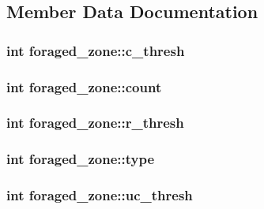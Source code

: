 \subsection{Member Data Documentation}
\hypertarget{classforaged__zone_a0d0a0849a8d31d4644378ec94fa840e5}{
\subsubsection[{c\-\_\-thresh}]{\setlength{\rightskip}{0pt plus 5cm}int foraged\-\_\-zone\-::c\-\_\-thresh}}\label{classforaged__zone_a0d0a0849a8d31d4644378ec94fa840e5}
\hypertarget{classforaged__zone_a97455af0ff760dde682fa9d846ef58fd}{
\subsubsection[{count}]{\setlength{\rightskip}{0pt plus 5cm}int foraged\-\_\-zone\-::count}}\label{classforaged__zone_a97455af0ff760dde682fa9d846ef58fd}
\hypertarget{classforaged__zone_ace74d9e1d0474dfe6820e03ac31761a6}{
\subsubsection[{r\-\_\-thresh}]{\setlength{\rightskip}{0pt plus 5cm}int foraged\-\_\-zone\-::r\-\_\-thresh}}\label{classforaged__zone_ace74d9e1d0474dfe6820e03ac31761a6}
\hypertarget{classforaged__zone_a21f3ecbe3a7f26e03e8f91999bdb28ac}{
\subsubsection[{type}]{\setlength{\rightskip}{0pt plus 5cm}int foraged\-\_\-zone\-::type}}\label{classforaged__zone_a21f3ecbe3a7f26e03e8f91999bdb28ac}
\hypertarget{classforaged__zone_a99189b8e3149f1925d9cd5f15537ff26}{
\subsubsection[{uc\-\_\-thresh}]{\setlength{\rightskip}{0pt plus 5cm}int foraged\-\_\-zone\-::uc\-\_\-thresh}}\label{classforaged__zone_a99189b8e3149f1925d9cd5f15537ff26}
